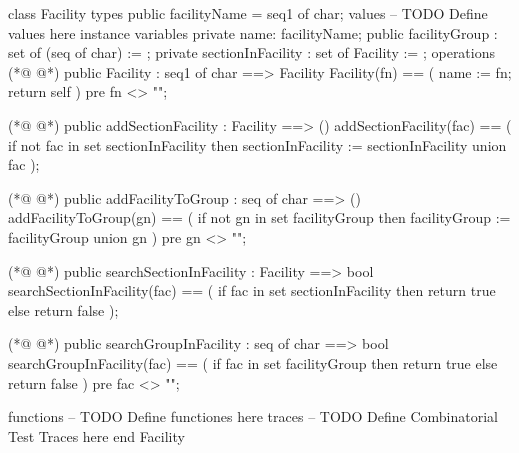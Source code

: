 \begin{vdmpp}[breaklines=true]
class Facility
types
   public facilityName = seq1 of char;
values
-- TODO Define values here
instance variables
 private name: facilityName;
 public facilityGroup : set of (seq of char) := { };
 private sectionInFacility : set of Facility := { };
operations
(*@
\label{Facility:11}
@*)
 public Facility : seq1 of char ==> Facility
  Facility(fn) == (
   name := fn;
   return self
  )
  pre fn <> "";
 
(*@
\label{addSectionFacility:18}
@*)
 public addSectionFacility : Facility ==> ()
  addSectionFacility(fac) == (
  if not fac in set sectionInFacility 
  then sectionInFacility := sectionInFacility union {fac} 
  );
  
(*@
\label{addFacilityToGroup:24}
@*)
 public addFacilityToGroup : seq of char ==> ()
  addFacilityToGroup(gn) == (
  if not gn in set facilityGroup 
  then facilityGroup := facilityGroup union {gn} 
  )
  pre gn <> "";
  
(*@
\label{searchSectionInFacility:31}
@*)
 public searchSectionInFacility : Facility ==> bool
  searchSectionInFacility(fac) == (
   if fac in set sectionInFacility
    then return true
    else return false
  );
 
(*@
\label{searchGroupInFacility:38}
@*)
 public searchGroupInFacility : seq of char ==> bool
  searchGroupInFacility(fac) == (
   if fac in set facilityGroup
    then return true
    else return false
  )
  pre fac <> "";
  
functions
-- TODO Define functiones here
traces
-- TODO Define Combinatorial Test Traces here
end Facility
\end{vdmpp}
